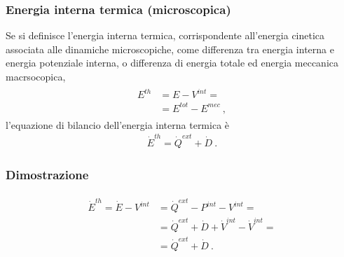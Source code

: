 \documentclass[letterpaper,10pt,italian]{jupyterBook}
\begin{document}
\subsubsection{Energia interna termica (microscopica)}
\label{\detokenize{ch/circuits-electromechanic:energia-interna-termica-microscopica}}
\sphinxAtStartPar
Se si definisce l’energia interna termica, corrispondente all’energia cinetica associata alle dinamiche microscopiche, come differenza tra energia interna e energia potenziale interna, o differenza di energia totale ed energia meccanica macrsocopica,
\begin{equation*}
\begin{split}\begin{aligned}
  E^{th} & = E - V^{int} = \\
         & = E^{tot} - E^{mec} \ ,
\end{aligned}\end{split}
\end{equation*}
\sphinxAtStartPar
l’equazione di bilancio dell’energia interna termica è
\begin{equation*}
\begin{split}   \dot{E}^{th} = \dot{Q}^{ext} + \dot{D} \ . \end{split}
\end{equation*}\subsubsection*{Dimostrazione}
\begin{equation*}
\begin{split}\begin{aligned}
  \dot{E}^{th} = \dot{E} - V^{int}
    & = \dot{Q}^{ext} - P^{int} - V^{int} = \\
    & = \dot{Q}^{ext} + \dot{D} + \dot{V}^{int} - \dot{V}^{int} = \\
    & = \dot{Q}^{ext} + \dot{D} \ .
\end{aligned}\end{split}
\end{equation*}
\sphinxAtStartPar
{} 
\end{document}
